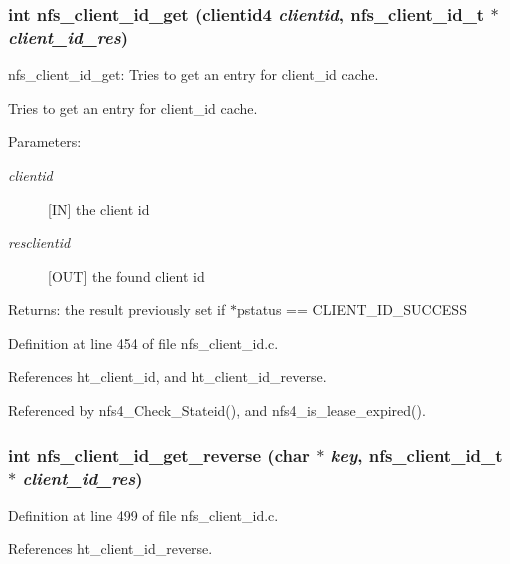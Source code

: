 \subsubsection{\setlength{\rightskip}{0pt plus 5cm}int nfs\_\-client\_\-id\_\-get (clientid4 {\em clientid}, nfs\_\-client\_\-id\_\-t $\ast$ {\em client\_\-id\_\-res})}\label{nfs__client__id_8c_a15}


nfs\_\-client\_\-id\_\-get: Tries to get an entry for client\_\-id cache.

Tries to get an entry for client\_\-id cache.

\begin{Desc}
\item[Parameters:]
\begin{description}
\item[{\em clientid}][IN] the client id \item[{\em resclientid}][OUT] the found client id\end{description}
\end{Desc}
\begin{Desc}
\item[Returns:]the result previously set if $\ast$pstatus == CLIENT\_\-ID\_\-SUCCESS \end{Desc}


Definition at line 454 of file nfs\_\-client\_\-id.c.

References ht\_\-client\_\-id, and ht\_\-client\_\-id\_\-reverse.

Referenced by nfs4\_\-Check\_\-Stateid(), and nfs4\_\-is\_\-lease\_\-expired().
\subsubsection{\setlength{\rightskip}{0pt plus 5cm}int nfs\_\-client\_\-id\_\-get\_\-reverse (char $\ast$ {\em key}, nfs\_\-client\_\-id\_\-t $\ast$ {\em client\_\-id\_\-res})}\label{nfs__client__id_8c_a16}




Definition at line 499 of file nfs\_\-client\_\-id.c.

References ht\_\-client\_\-id\_\-reverse.
